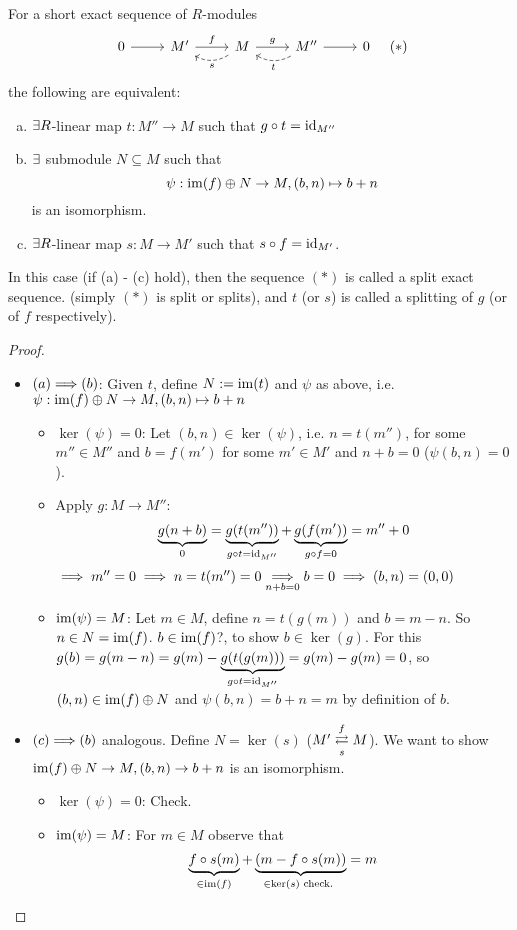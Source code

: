 \documentclass[a4paper]{report}
\begin{document}
\begin{thm-defi}
  For a short exact sequence of $R$-modules %
  \[\begin{tikzcd}
0 \arrow[r] & M' \arrow[r, "f"] & M \arrow[r, "g"] \arrow[l, "s", dashed, bend left] & M'' \arrow[r] \arrow[l, "t", dashed, bend left] & 0
\end{tikzcd} \quad (*)\]
  the following are equivalent:
  \begin{enumerate}[(a)]
    \item $\exists R$-linear map $t: M'' \to M$ such that $g \circ t = \operatorname{id}_{M''}$
    \item $\exists$ submodule $N \subseteq M$ such that \[\psi: \operatorname{im}(f) \oplus N \to M, (b,n) \mapsto b+n\]
          is an isomorphism.
          \item $\exists R$-linear map $s: M \to M'$ such that $s \circ f = \operatorname{id}_{M'}$.
  \end{enumerate}
  In this case (if (a) - (c) hold), then the sequence $(*)$ is called a split exact sequence. (simply $(*)$ is split or splits), and $t$ (or $s$) is called a splitting of $g$ (or of $f$ respectively).
  \begin{proof}
    \begin{itemize}
      \item $(a){\implies}(b)$: Given $t$, define $N:= \operatorname{im}(t)$ and $\psi$ as above, i.e. $\psi: \operatorname{im}(f) \oplus N \to M, (b,n) \mapsto b+n$
            \begin{itemize}
              \item $\ker(\psi) = 0$: Let $(b,n) \in \ker(\psi)$, i.e. $n = t(m'')$, for some $m'' \in M''$ and $b = f(m')$ for some $m' \in M'$ and $n+b = 0$ ($\psi(b,n) = 0$).
              \item Apply $g: M \to M''$: \[\underbrace{g(n+b)}_{0} = \underbrace{g(t(m''))}_{g \circ t = \operatorname{id}_{M''}} + \underbrace{g(f(m'))}_{g \circ f = 0} = m''+0\]
                    $\implies m'' = 0 \implies n = t(m'') = 0 \underset{n+b=0}{\implies} b=0 \implies (b,n) = (0,0)$
                    \item $\operatorname{im}(\psi) = M$: Let $m \in M$, define $n = t(g(m))$ and $b = m-n$. So $n \in N = \operatorname{im}(f)$. $b \in \operatorname{im}(f)$?, to show $b \in \ker(g)$. For this $g(b) = g(m-n) = g(m) - \underbrace{g(t(g(m)))}_{g\circ t = \operatorname{id}_{M''}} = g(m) - g(m)= 0$, so $(b,n) \in \operatorname{im}(f) \oplus N$ and $\psi(b,n) = b+n = m$ by definition of $b$.
            \end{itemize}
      \item $(c) {\implies} (b)$ analogous. Define $N = \ker(s)$ ($M' \overunderset fs \rightleftarrows M$). We want to show $\operatorname{im}(f) \oplus N \to M, (b,n) \to b+n$ is an isomorphism.
            \begin{itemize}
              \item $\ker(\psi) = 0$: Check.
              \item $\operatorname{im}(\psi) = M$: For $m \in M$ observe that \[\underbrace{f \circ s(m)}_{\in \operatorname{im}(f)} + \underbrace{(m-f\circ s(m))}_{\in \ker(s) \text{ check. }} = m\]
            \end{itemize}


\end{itemize}
\end{proof}
\end{thm-defi}
\end{document}
